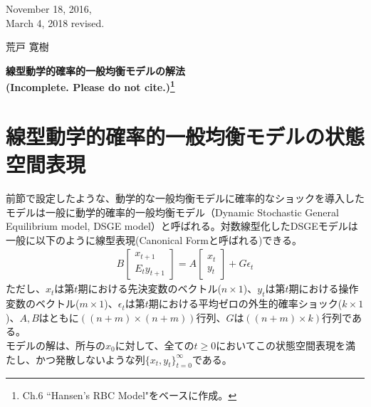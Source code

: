 \documentclass[a4j, dvipdfmx]{jarticle}
\begin{document}
\begin{flushright}
November 18, 2016,\\
March 4, 2018 revised.

荒戸 寛樹
\end{flushright}
\begin{center}
\Large{\textbf{
線型動学的確率的一般均衡モデルの解法 \\ (Incomplete. Please do not cite.)\footnote{\citet{mccan2008:abcs} Ch.6 ``Hansen's RBC Model"をベースに作成。}
}}
\end{center}
\vspace{10pt}
\section{線型動学的確率的一般均衡モデルの状態空間表現}
前節で設定したような、動学的な一般均衡モデルに確率的なショックを導入したモデルは一般に動学的確率的一般均衡モデル（Dynamic Stochastic General Equilibrium model, DSGE model）と呼ばれる。対数線型化したDSGEモデルは一般に以下のように線型表現(Canonical Formと呼ばれる)できる。
\begin{align}
B\begin{bmatrix}x_{t+1}\\E_t y_{t+1}\end{bmatrix} = A\begin{bmatrix}x_t\\y_t\end{bmatrix} + G\epsilon_t\label{ssr}
\end{align}
ただし、$x_t$は第$t$期における先決変数のベクトル($n\times 1$)、$y_t$は第$t$期における操作変数のベクトル($m\times 1$)、$\epsilon_t$は第$t$期における平均ゼロの外生的確率ショック($k\times 1$)、$A, B$はともに$((n+m)\times (n+m))$行列、$G$は$((n+m)\times k)$行列である。\\

モデルの解は、所与の$x_0$に対して、全ての$t\ge0$においてこの状態空間表現を満たし、かつ発散しないような列$\{x_t, y_t\}_{t=0}^\infty$である。
\end{document}
